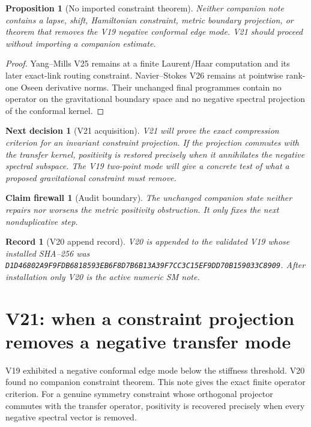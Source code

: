 \documentclass[11pt]{article}
\newtheorem{proposition}[theorem]{Proposition}
\newtheorem{firewall}[theorem]{Claim firewall}
\newtheorem{decision}[theorem]{Next decision}
\newtheorem{record}[theorem]{Record}
\theoremstyle{remark}
\begin{document}
\begin{proposition}[No imported constraint theorem]
\label{prop:v19v20-no-import}
Neither companion note contains a lapse, shift, Hamiltonian constraint,
metric boundary projection, or theorem that removes the V19 negative
conformal edge mode.  V21 should proceed without importing a companion
estimate.
\end{proposition}

\begin{proof}
Yang--Mills V25 remains at a finite Laurent/Haar computation and its later
exact-link routing constraint.  Navier--Stokes V26 remains at pointwise
rank-one Oseen derivative norms.  Their unchanged final programmes contain
no operator on the gravitational boundary space and no negative spectral
projection of the conformal kernel.
\end{proof}

\begin{decision}[V21 acquisition]
\label{dec:v19v20-next}
V21 will prove the exact compression criterion for an invariant constraint
projection.  If the projection commutes with the transfer kernel,
positivity is restored precisely when it annihilates the negative spectral
subspace.  The V19 two-point mode will give a concrete test of what a
proposed gravitational constraint must remove.
\end{decision}

\begin{firewall}[Audit boundary]
\label{fire:v19v20}
The unchanged companion state neither repairs nor worsens the metric
positivity obstruction.  It only fixes the next nonduplicative step.
\end{firewall}

\begin{record}[V20 append record]
\label{rec:v19v20}
V20 is appended to the validated V19 whose installed SHA--256 was
\texttt{D1D46802A9F9FDB6818593EB6F8D7B6B13A39F7CC3C15EF9DD70B159033C8909}.
After installation only V20 is the active numeric SM note.
\end{record}



\section{V21: when a constraint projection removes a negative transfer mode}
\label{sec:v19v21}

V19 exhibited a negative conformal edge mode below the stiffness threshold.
V20 found no companion constraint theorem.  This note gives the exact
finite operator criterion.  For a genuine symmetry constraint whose
orthogonal projector commutes with the transfer operator, positivity is
recovered precisely when every negative spectral vector is removed.
\end{document}
